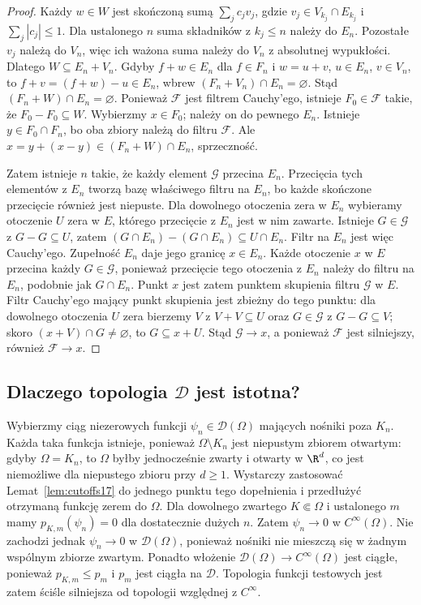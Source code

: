 \begin{proof}
Każdy $w\in W$ jest skończoną sumą $\sum_j c_jv_j$,
gdzie $v_j\in V_{k_j}\cap E_{k_j}$ i $\sum_j|c_j|\le1$.
Dla ustalonego $n$ suma składników z $k_j\le n$
należy do $E_n$. Pozostałe $v_j$ należą do $V_n$,
więc ich ważona suma należy do $V_n$ z absolutnej wypukłości.
Dlatego $W\subseteq E_n+V_n$.
Gdyby $f+w\in E_n$ dla $f\in F_n$ i $w=u+v$,
$u\in E_n$, $v\in V_n$, to $f+v=(f+w)-u\in E_n$,
wbrew $(F_n+V_n)\cap E_n=\varnothing$.
Stąd $(F_n+W)\cap E_n=\varnothing$.
Ponieważ $\mathcal F$ jest filtrem Cauchy'ego, istnieje
$F_0\in\mathcal F$ takie, że $F_0-F_0\subseteq W$.
Wybierzmy $x\in F_0$; należy on do pewnego $E_n$.
Istnieje $y\in F_0\cap F_n$, bo oba zbiory należą do
filtru $\mathcal F$. Ale
$x=y+(x-y)\in(F_n+W)\cap E_n$, sprzeczność.

Zatem istnieje $n$ takie, że każdy element $\mathcal G$
przecina $E_n$. Przecięcia tych elementów z $E_n$
tworzą bazę właściwego filtru na $E_n$,
bo każde skończone przecięcie również jest niepuste.
Dla dowolnego otoczenia zera w $E_n$ wybieramy otoczenie
$U$ zera w $E$, którego przecięcie z $E_n$ jest w nim
zawarte. Istnieje $G\in\mathcal G$ z $G-G\subseteq U$,
zatem $(G\cap E_n)-(G\cap E_n)\subseteq U\cap E_n$.
Filtr na $E_n$ jest więc Cauchy'ego. Zupełność $E_n$
daje jego granicę $x\in E_n$. Każde otoczenie $x$ w $E$
przecina każdy $G\in\mathcal G$, ponieważ przecięcie
tego otoczenia z $E_n$ należy do filtru na $E_n$,
podobnie jak $G\cap E_n$. Punkt $x$ jest zatem punktem
skupienia filtru $\mathcal G$ w $E$. Filtr Cauchy'ego mający punkt skupienia
jest zbieżny do tego punktu: dla dowolnego otoczenia
$U$ zera bierzemy $V$ z $V+V\subseteq U$ oraz
$G\in\mathcal G$ z $G-G\subseteq V$; skoro
$(x+V)\cap G\ne\varnothing$, to $G\subseteq x+U$.
Stąd $\mathcal G\to x$, a ponieważ $\mathcal F$ jest
silniejszy, również $\mathcal F\to x$.
\end{proof}

\subsection{Dlaczego topologia \texorpdfstring{$\mathcal D$}{D} jest istotna?}

\begin{przyklad}
\label{ex:escaping18}
Wybierzmy ciąg niezerowych funkcji $\psi_n\in\mathcal D(\Omega)$
mających nośniki poza $K_n$. Każda taka funkcja istnieje,
ponieważ $\Omega\setminus K_n$ jest niepustym zbiorem otwartym:
gdyby $\Omega=K_n$, to $\Omega$ byłby jednocześnie zwarty
i otwarty w $\R^d$, co jest niemożliwe dla niepustego
zbioru przy $d\ge1$. Wystarczy zastosować
Lemat~\ref{lem:cutoffs17} do jednego punktu tego dopełnienia
i przedłużyć otrzymaną funkcję zerem do $\Omega$.
Dla dowolnego zwartego $K\Subset\Omega$ i ustalonego $m$
mamy $p_{K,m}(\psi_n)=0$ dla dostatecznie dużych $n$.
Zatem $\psi_n\to0$ w $C^\infty(\Omega)$.
Nie zachodzi jednak $\psi_n\to0$ w $\mathcal D(\Omega)$,
ponieważ nośniki nie mieszczą się w żadnym wspólnym
zbiorze zwartym. Ponadto włożenie
$\mathcal D(\Omega)\to C^\infty(\Omega)$ jest ciągłe,
ponieważ $p_{K,m}\le p_m$ i $p_m$ jest ciągła na $\mathcal D$.
Topologia funkcji testowych jest zatem ściśle silniejsza
od topologii względnej z $C^\infty$.
\end{przyklad}

